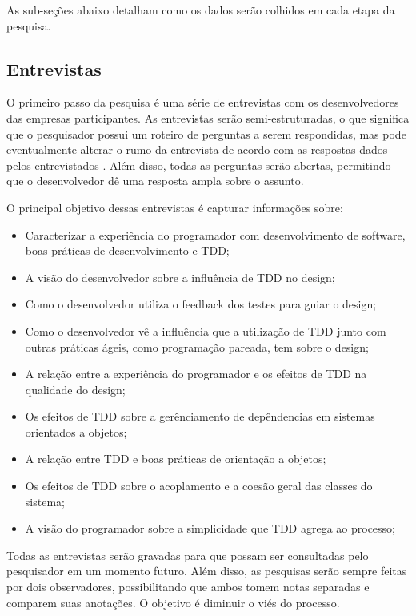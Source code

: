 As sub-seções abaixo detalham como os dados serão colhidos em cada etapa da pesquisa.

\subsection{Entrevistas}
\label{sec:planejamento-estrategia-entrevistas}

O primeiro passo da pesquisa é uma série de entrevistas com os desenvolvedores das empresas participantes. 
As entrevistas serão semi-estruturadas, o que significa que o pesquisador possui um roteiro de perguntas a serem respondidas, mas pode eventualmente
alterar o rumo da entrevista de acordo com as respostas dados pelos entrevistados \cite{guidelines-case-study}. 
Além disso, todas as perguntas serão abertas, permitindo que o desenvolvedor dê uma resposta ampla sobre o assunto.

O principal objetivo dessas entrevistas é capturar informações sobre:

\begin{itemize}
	\item Caracterizar a experiência do programador com desenvolvimento de software, boas práticas de desenvolvimento e TDD;
	\item A visão do desenvolvedor sobre a influência de TDD no design;
	\item Como o desenvolvedor utiliza o feedback dos testes para guiar o design;
	\item Como o desenvolvedor vê a influência que a utilização de TDD junto com outras práticas ágeis, como programação pareada, tem sobre o design;
	\item A relação entre a experiência do programador e os efeitos de TDD na qualidade do design;
	\item Os efeitos de TDD sobre a gerênciamento de depêndencias em sistemas orientados a objetos;
	\item A relação entre TDD e boas práticas de orientação a objetos;
	\item Os efeitos de TDD sobre o acoplamento e a coesão geral das classes do sistema;
	\item A visão do programador sobre a simplicidade que TDD agrega ao processo;
\end{itemize} 

Todas as entrevistas serão gravadas para que possam ser consultadas pelo pesquisador em um momento futuro. Além disso,
as pesquisas serão sempre feitas por dois observadores, possibilitando que ambos tomem notas separadas e comparem
suas anotações. O objetivo é diminuir o viés do processo.

